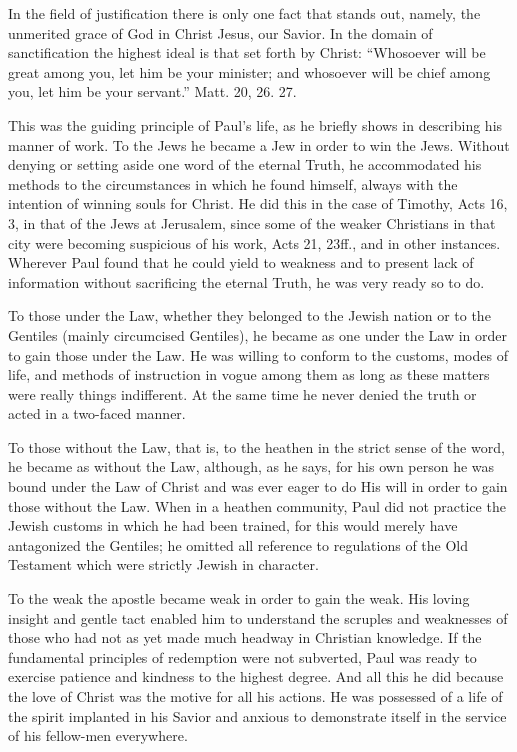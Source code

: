 \documentclass[
]{book}
\begin{document}
In the field of justification there is only one fact that stands out, namely, the unmerited grace of God in Christ Jesus, our Savior. In the domain of sanctification the highest ideal is that set forth by Christ: ``Whosoever will be great among you, let him be your minister; and whosoever will be chief among you, let him be your servant.'' Matt. 20, 26. 27.

This was the guiding principle of Paul's life, as he briefly shows in describing his manner of work. To the Jews he became a Jew in order to win the Jews. Without denying or setting aside one word of the eternal Truth, he accommodated his methods to the circumstances in which he found himself, always with the intention of winning souls for Christ. He did this in the case of Timothy, Acts 16, 3, in that of the Jews at Jerusalem, since some of the weaker Christians in that city were becoming suspicious of his work, Acts 21, 23ff., and in other instances. Wherever Paul found that he could yield to weakness and to present lack of information without sacrificing the eternal Truth, he was very ready so to do.

To those under the Law, whether they belonged to the Jewish nation or to the Gentiles (mainly circumcised Gentiles), he became as one under the Law in order to gain those under the Law. He was willing to conform to the customs, modes of life, and methods of instruction in vogue among them as long as these matters were really things indifferent. At the same time he never denied the truth or acted in a two-faced manner.

To those without the Law, that is, to the heathen in the strict sense of the word, he became as without the Law, although, as he says, for his own person he was bound under the Law of Christ and was ever eager to do His will in order to gain those without the Law. When in a heathen community, Paul did not practice the Jewish customs in which he had been trained, for this would merely have antagonized the Gentiles; he omitted all reference to regulations of the Old Testament which were strictly Jewish in character.

To the weak the apostle became weak in order to gain the weak. His loving insight and gentle tact enabled him to understand the scruples and weaknesses of those who had not as yet made much headway in Christian knowledge. If the fundamental principles of redemption were not subverted, Paul was ready to exercise patience and kindness to the highest degree. And all this he did because the love of Christ was the motive for all his actions. He was possessed of a life of the spirit implanted in his Savior and anxious to demonstrate itself in the service of his fellow-men everywhere.
\end{document}
